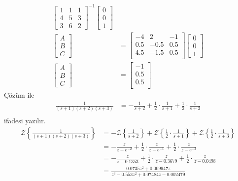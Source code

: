 \begin{enumerate}[\bfseries S1.]
\begin{equation}
\begin{split}
\begin{bmatrix}
            1& 1& 1\\
            4& 5& 3\\
            3& 6& 2
        \end{bmatrix}^{-1}\begin{bmatrix}0\\0\\1\end{bmatrix}\\
        \begin{bmatrix}A\\B\\C\end{bmatrix}&=\begin{bmatrix}
            -4 &   2   &    -1\\
            0.5&   -0.5&    0.5\\
            4.5&   -1.5&    0.5\\
        \end{bmatrix}\begin{bmatrix}0\\0\\1\end{bmatrix}\\
        \begin{bmatrix}A\\B\\C\end{bmatrix}&=\begin{bmatrix}
        -1\\
        0.5\\
        0.5\\
        \end{bmatrix}
        \end{split}
    \end{equation}
    Çözüm ile
    \begin{equation}
        \begin{split}
            \frac{1}{(s+1)(s+2)(s+3)}&=-\frac{1}{s+2}+\frac{1}{2}\cdot\frac{1}{s+1}+\frac{1}{2}\cdot\frac{1}{s+3}\\
        \end{split}
    \end{equation}
    ifadesi yazılır.
    \begin{equation}
        \begin{split}
            \mathcal{Z}\left\{\frac{1}{(s+1)(s+2)(s+3)}\right\}&=
            -\mathcal{Z}\left\{\frac{1}{s+2}\right\}+\mathcal{Z}\left\{\frac{1}{2}\cdot\frac{1}{s+1}\right\}+\mathcal{Z}\left\{\frac{1}{2}\cdot\frac{1}{s+3}\right\}\\
            &=-\frac{z}{z-e^{-2}}+\frac{1}{2}\cdot\frac{z}{z-e^{-1}}+\frac{1}{2}\cdot\frac{z}{z-e^{-3}}\\
            &=-\frac{z}{z-0.1353}+\frac{1}{2}\cdot\frac{z}{z-0.3679}+\frac{1}{2}\cdot\frac{z}{z-0.0498}\\
            &=\frac{0.0735 z^2 + 0.009947 z}{z^3 - 0.553 z^2 + 0.07484 z - 0.002479}
        \end{split}
    \end{equation}

\end{enumerate}
